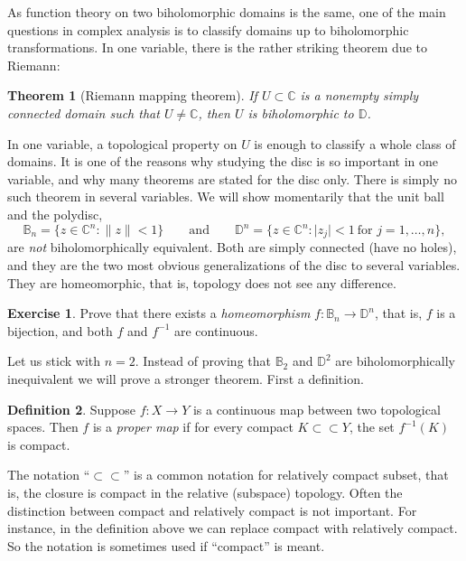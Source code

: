 \documentclass[12pt,openany]{book}
\newcommand{\sabs}[1]{\lvert {#1} \rvert}
\newcommand{\snorm}[1]{\lVert {#1} \rVert}
\newcommand{\C}{{\mathbb{C}}}
\newcommand{\D}{{\mathbb{D}}}
\newcommand{\bB}{{\mathbb{B}}}
\newcommand{\myindex}[1]{#1\index{#1}}
\theoremstyle{plain}
\newtheorem{thm}{Theorem}[section]
\theoremstyle{remark}
\theoremstyle{definition}
\newtheorem{defn}[thm]{Definition}
\newenvironment{exbox}{%
    \def\FrameCommand{\vrule width 1pt \relax\hspace{10pt}}%
    \MakeFramed {\advance \hsize -\width \FrameRestore}%
}{%
    \endMakeFramed
}
\theoremstyle{exercise}
\newtheorem{exercise}{Exercise}[section]
\theoremstyle{example}
\begin{document}
As function theory on two biholomorphic domains is the same,
one of the main questions in complex analysis is to classify domains up
to biholomorphic transformations.  In one variable, there is the rather
striking theorem due to Riemann:

\begin{thm}[Riemann mapping theorem]
If $U \subset \C$ is a nonempty simply connected domain such that $U \neq \C$,
then $U$ is biholomorphic to $\D$.
\end{thm}

In one variable, a topological property on $U$ is enough to classify a whole
class of domains.  It is one of the reasons why studying the disc is so
important in one variable, and why many theorems are stated for
the disc only.
There is simply no such theorem in several variables.
We will show momentarily that the unit ball and the polydisc,
\begin{equation*}
\bB_n = \bigl\{ z \in \C^n : \snorm{z} < 1 \bigr\}
\qquad \text{and} \qquad
\D^n = \bigl\{ z \in \C^n : \sabs{z_j} < 1 ~\text{for $j=1,\ldots,n$} \bigr\} ,
\end{equation*}
are \emph{not} biholomorphically equivalent.  Both are simply
connected (have no holes), and they are the two most obvious generalizations
of the disc to several variables.  They are homeomorphic, that is, topology
does not see any difference.

\begin{exbox}
\begin{exercise}
Prove that there exists a \emph{\myindex{homeomorphism}} $f \colon \bB_n \to
\D^n$,
that is, $f$ is a bijection, and both $f$ and $f^{-1}$ are continuous.
\end{exercise}
\end{exbox}


Let us stick with $n=2$.
Instead of proving that $\bB_2$ and
$\D^2$ are biholomorphically 
inequivalent we will prove a stronger theorem.  First a
definition.

\begin{defn}
Suppose $f \colon X \to Y$ is a continuous map between two topological
spaces.  Then $f$ is a \emph{\myindex{proper map}} if for every compact
%
%
$K \subset \subset Y$, the set $f^{-1}(K)$ is compact.
\end{defn}

The notation ``$\subset \subset$'' is a common notation for relatively
compact subset, that is, the closure is compact in the relative (subspace)
topology.  Often the distinction between compact and relatively
compact is not important.  For instance, in the definition above we can replace
compact with relatively compact.
So the notation is sometimes used if ``compact'' is meant.
\end{document}

